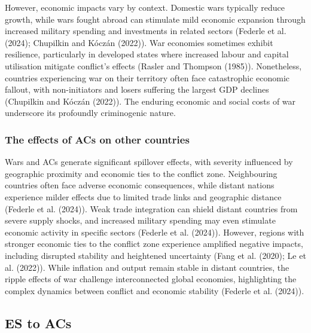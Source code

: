 \documentclass[
]{article}
\begin{document}
However, economic impacts vary by context. Domestic wars typically
reduce growth, while wars fought abroad can stimulate mild economic
expansion through increased military spending and investments in related
sectors (Federle et al. (2024); Chupilkin and Kóczán (2022)). War
economies sometimes exhibit resilience, particularly in developed states
where increased labour and capital utilisation mitigate conflict's
effects (Rasler and Thompson (1985)). Nonetheless, countries
experiencing war on their territory often face catastrophic economic
fallout, with non-initiators and losers suffering the largest GDP
declines (Chupilkin and Kóczán (2022)). The enduring economic and social
costs of war underscore its profoundly criminogenic nature.

\subsubsection{The effects of ACs on other
countries}\label{the-effects-of-acs-on-other-countries}

Wars and ACs generate significant spillover effects, with severity
influenced by geographic proximity and economic ties to the conflict
zone. Neighbouring countries often face adverse economic consequences,
while distant nations experience milder effects due to limited trade
links and geographic distance (Federle et al. (2024)). Weak trade
integration can shield distant countries from severe supply shocks, and
increased military spending may even stimulate economic activity in
specific sectors (Federle et al. (2024)). However, regions with stronger
economic ties to the conflict zone experience amplified negative
impacts, including disrupted stability and heightened uncertainty (Fang
et al. (2020); Le et al. (2022)). While inflation and output remain
stable in distant countries, the ripple effects of war challenge
interconnected global economies, highlighting the complex dynamics
between conflict and economic stability (Federle et al. (2024)).

\subsection{ES to ACs}\label{es-to-acs}
\end{document}
